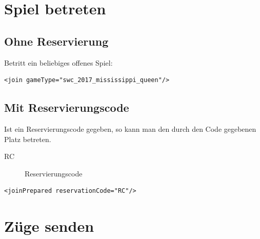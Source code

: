 \documentclass[12pt,a4paper, ngerman, oneside]{scrartcl}
\begin{document}
\section{Spiel betreten}
\subsection{Ohne Reservierung}
Betritt ein beliebiges offenes Spiel:
\begin{verbatim}
<join gameType="swc_2017_mississippi_queen"/>
\end{verbatim}
\subsection{Mit Reservierungscode}
Ist ein Reservierungscode gegeben, so kann man den durch den Code gegebenen Platz betreten.
\begin{description}
\item[RC] Reservierungscode
\end{description}
\begin{verbatim}
<joinPrepared reservationCode="RC"/>
\end{verbatim}

\section{Züge senden}
\end{document}
